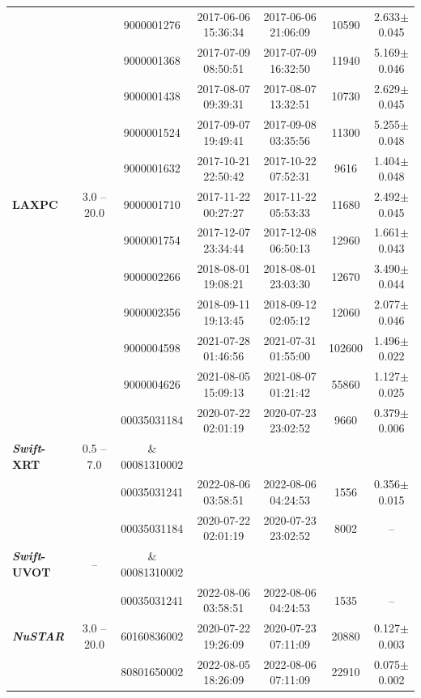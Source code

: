 \documentclass[11pt]{article}
\begin{document}
\begin{table}[htbp]
{\begin{tabular}{lcccccc}
\\
            \hline
            && 9000001276& 2017-06-06 15:36:34& 2017-06-06 21:06:09& 10590&2.633$\pm$0.045
\\
                  && 9000001368 & 2017-07-09 08:50:51& 2017-07-09 16:32:50& 11940&5.169$\pm$0.046
\\
                  && 9000001438 & 2017-08-07 09:39:31& 2017-08-07 13:32:51& 10730&2.629$\pm$0.045
\\
                  && 9000001524& 2017-09-07 19:49:41& 2017-09-08 03:35:56& 11300&5.255$\pm$0.048
\\
                  && 9000001632& 2017-10-21 22:50:42& 2017-10-22 07:52:31& 9616&1.404$\pm$0.048
\\
{\bf{LAXPC}}& 3.0 -- 20.0&9000001710& 2017-11-22 00:27:27& 2017-11-22 05:53:33& 11680&2.492$\pm$0.045
\\
                  && 9000001754& 2017-12-07 23:34:44& 2017-12-08 06:50:13& 12960&1.661$\pm$0.043
\\
                  && 9000002266& 2018-08-01 19:08:21& 2018-08-01 23:03:30& 12670&3.490$\pm$0.044
\\
                  && 9000002356& 2018-09-11 19:13:45& 2018-09-12 02:05:12& 12060&2.077$\pm$0.046
\\
                  && 9000004598 & 2021-07-28 01:46:56& 2021-07-31 01:55:00& 102600&1.496$\pm$0.022
\\
                  && 9000004626& 2021-08-05 15:09:13& 2021-08-07 01:21:42& 55860&1.127$\pm$0.025
\\
                  \hline
 & &00035031184 &2020-07-22 02:01:19&2020-07-23 23:02:52 & 9660&0.379$\pm$0.006\\
 {\bf{\textit{Swift}-XRT}}&0.5 -- 7.0 & \& 00081310002& & & &\\
                  && 00035031241& 2022-08-06 03:58:51& 2022-08-06 04:24:53& 1556&0.356$\pm$0.015
\\
                  \hline
                  
 & &00035031184 &2020-07-22 02:01:19&2020-07-23 23:02:52 & 8002&   --\\
 {\bf{\textit{Swift}-UVOT}}& --   & \& 00081310002& & & &\\
                  && 00035031241& 2022-08-06 03:58:51& 2022-08-06 04:24:53& 1535& --
\\

                  \hline{\bf{\textit{NuSTAR}}}&3.0 -- 20.0&60160836002 &2020-07-22 19:26:09 &2020-07-23 07:11:09 &20880&0.127$\pm$0.003
\\
                  &&80801650002&2022-08-05 18:26:09 &2022-08-06 07:11:09 &22910&0.075$\pm$0.002\\

 \hline

	\end{tabular}
}
\end{table}
\end{document}
